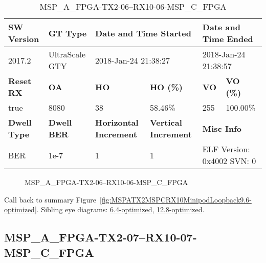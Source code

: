 \begin{table}[h]
\centering
\caption{MSP\_A\_FPGA-TX2-06--RX10-06-MSP\_C\_FPGA}
\label{tab:MSPAFPGATX206RX1006MSPCFPGA9.6-optimized}
\begin{tabular}{@{}|l|l|l|l|l|l|@{}}
\toprule
\textbf{SW Version}                & \textbf{GT Type}   & \multicolumn{2}{l|}{\textbf{Date and Time Started}}            & \multicolumn{2}{l|}{\textbf{Date and Time Ended}}        \\ \midrule
2017.2                       & UltraScale GTY          & \multicolumn{2}{l|}{2018-Jan-24 21:38:27}                   & \multicolumn{2}{l|}{2018-Jan-24 21:38:57}               \\ \midrule
\textbf{Reset RX}                  & \textbf{OA} & \textbf{HO}   & \textbf{HO (\%)} & \textbf{VO} & \textbf{VO (\%)} \\ \midrule
true & 8080        & 38          & 58.46\%        & 255        & 100.00\%       \\ \midrule
\textbf{Dwell Type}                & \textbf{Dwell BER} & \textbf{Horizontal Increment} & \textbf{Vertical Increment}    & \multicolumn{2}{l|}{\textbf{Misc Info}}                  \\ \midrule
BER                            & 1e-7        & 1        & 1           & \multicolumn{2}{l|}{ELF Version: 0x4002 SVN: 0}                         \\ \bottomrule
\end{tabular}
\end{table}

\begin{figure}[h]
\caption{MSP\_A\_FPGA-TX2-06--RX10-06-MSP\_C\_FPGA} \label{fig:MSPAFPGATX206RX1006MSPCFPGA9.6-optimized}
\end{figure}

Call back to summary Figure~\ref{fig:MSPATX2MSPCRX10MinipodLoopback9.6-optimized}.
Sibling eye diagrams: \hyperref[sec:MSPAFPGATX206RX1006MSPCFPGA6.4-optimized]{6.4-optimized}, \hyperref[sec:MSPAFPGATX206RX1006MSPCFPGA12.8-optimized]{12.8-optimized}.

\clearpage
\newpage


\subsection{MSP\_A\_FPGA-TX2-07--RX10-07-MSP\_C\_FPGA}\label{sec:MSPAFPGATX207RX1007MSPCFPGA9.6-optimized}

